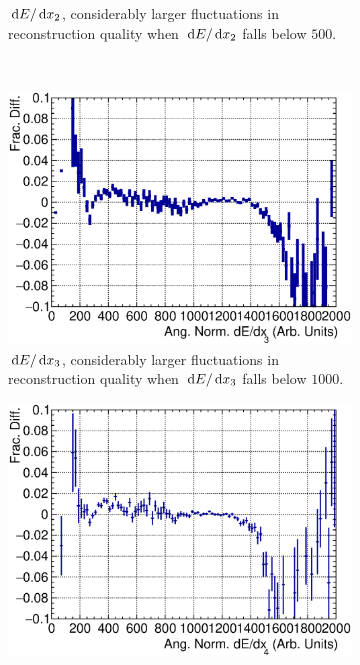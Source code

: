\begin{figure}[!htb]
\begin{subfigure}[!htb]{\dbfigwid\textwidth}
           \caption{$\,\textrm{d}E/\,\textrm{d}x_2$, considerably larger fluctuations in reconstruction quality when $\,\textrm{d}E/\,\textrm{d}x_2$ falls below $500$.}
           \label{subfig:dedx1}
      \end{subfigure}
      \\
      \begin{subfigure}[!htb]{\dbfigwid\textwidth}
           \includegraphics[width=\textwidth]{figures/sel/fig53c.eps}
           \caption{$\,\textrm{d}E/\,\textrm{d}x_3$, considerably larger fluctuations in reconstruction quality when $\,\textrm{d}E/\,\textrm{d}x_3$ falls below $1000$.}
           \label{subfig:dedx2}
      \end{subfigure}
      \begin{subfigure}{\dbfigwid\textwidth}
           \includegraphics[width=\textwidth]{figures/sel/fig53d.eps}

\end{subfigure}
\end{figure}
